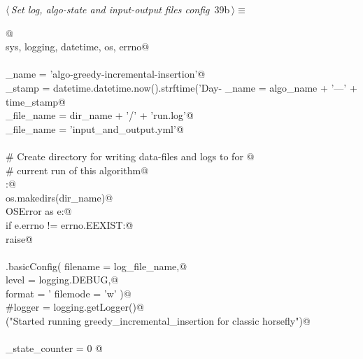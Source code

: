 \documentclass[11.5pt]{report}
\begin{document}
\begin{flushleft} \small\label{scrap47}\raggedright\small
{} $\langle\,${\itshape Set log, algo-state and input-output files config}\nobreak\ {\footnotesize {39b}}$\,\rangle\equiv$
\vspace{-1ex}
\begin{list}{}{} \item
\mbox{}\verb@  @\\
\mbox{}\verb@import sys, logging, datetime, os, errno@\\
\mbox{}\verb@@\\
\mbox{}\verb@algo_name     = 'algo-greedy-incremental-insertion'@\\
\mbox{}\verb@time_stamp    = datetime.datetime.now().strftime('Day-%Y-%m-%d_ClockTime-%H:%M:%S')@\\
\mbox{}\verb@dir_name      = algo_name + '---' + time_stamp@\\
\mbox{}\verb@log_file_name = dir_name + '/' + 'run.log'@\\
\mbox{}\verb@io_file_name  = 'input_and_output.yml'@\\
\mbox{}\verb@@\\
\mbox{}\verb@# Create directory for writing data-files and logs to for @\\
\mbox{}\verb@# current run of this algorithm@\\
\mbox{}\verb@try:@\\
\mbox{}\verb@    os.makedirs(dir_name)@\\
\mbox{}\verb@except OSError as e:@\\
\mbox{}\verb@    if e.errno != errno.EEXIST:@\\
\mbox{}\verb@        raise@\\
\mbox{}\verb@@\\
\mbox{}\verb@logging.basicConfig( filename = log_file_name,@\\
\mbox{}\verb@                     level    = logging.DEBUG,@\\
\mbox{}\verb@                     format   = '%(asctime)s: %(levelname)s: %(message)s',@\\
\mbox{}\verb@                     filemode = 'w' )@\\
\mbox{}\verb@#logger = logging.getLogger()@\\
\mbox{}\verb@info("Started running greedy_incremental_insertion for classic horsefly")@\\
\mbox{}\verb@@\\
\mbox{}\verb@algo_state_counter = 0 @\\

\end{list}
\end{flushleft}
\end{document}
